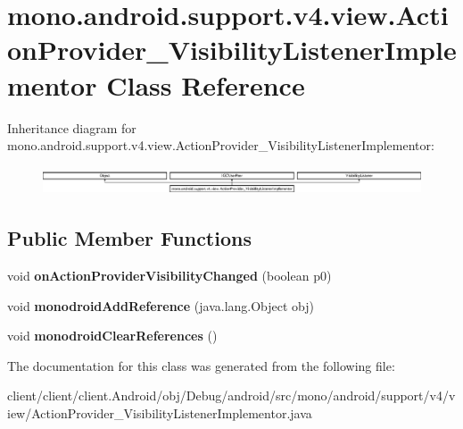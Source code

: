 \hypertarget{classmono_1_1android_1_1support_1_1v4_1_1view_1_1ActionProvider__VisibilityListenerImplementor}{}\section{mono.\+android.\+support.\+v4.\+view.\+Action\+Provider\+\_\+\+Visibility\+Listener\+Implementor Class Reference}
\label{classmono_1_1android_1_1support_1_1v4_1_1view_1_1ActionProvider__VisibilityListenerImplementor}
Inheritance diagram for mono.\+android.\+support.\+v4.\+view.\+Action\+Provider\+\_\+\+Visibility\+Listener\+Implementor\+:\begin{figure}[H]
\begin{center}
\leavevmode
\includegraphics[height=0.837070cm]{classmono_1_1android_1_1support_1_1v4_1_1view_1_1ActionProvider__VisibilityListenerImplementor}
\end{center}
\end{figure}
\subsection*{Public Member Functions}
\begin{DoxyCompactItemize}
\item 
\hypertarget{classmono_1_1android_1_1support_1_1v4_1_1view_1_1ActionProvider__VisibilityListenerImplementor_a242f9c61e064dd7019178ff6eb12b360}{}void {\bfseries on\+Action\+Provider\+Visibility\+Changed} (boolean p0)\label{classmono_1_1android_1_1support_1_1v4_1_1view_1_1ActionProvider__VisibilityListenerImplementor_a242f9c61e064dd7019178ff6eb12b360}

\item 
\hypertarget{classmono_1_1android_1_1support_1_1v4_1_1view_1_1ActionProvider__VisibilityListenerImplementor_aa32d9154545fa29cbb80371b3c21e709}{}void {\bfseries monodroid\+Add\+Reference} (java.\+lang.\+Object obj)\label{classmono_1_1android_1_1support_1_1v4_1_1view_1_1ActionProvider__VisibilityListenerImplementor_aa32d9154545fa29cbb80371b3c21e709}

\item 
\hypertarget{classmono_1_1android_1_1support_1_1v4_1_1view_1_1ActionProvider__VisibilityListenerImplementor_ab013ec17b3d4bb666c53f6acfc93b9c4}{}void {\bfseries monodroid\+Clear\+References} ()\label{classmono_1_1android_1_1support_1_1v4_1_1view_1_1ActionProvider__VisibilityListenerImplementor_ab013ec17b3d4bb666c53f6acfc93b9c4}

\end{DoxyCompactItemize}


The documentation for this class was generated from the following file\+:\begin{DoxyCompactItemize}
\item 
client/client/client.\+Android/obj/\+Debug/android/src/mono/android/support/v4/view/Action\+Provider\+\_\+\+Visibility\+Listener\+Implementor.\+java\end{DoxyCompactItemize}
